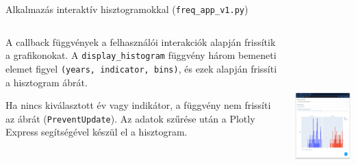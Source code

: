 \documentclass[english, aspectratio=169]{beamer}
\begin{document}
\begin{frame}{Alkalmazás interaktív hisztogramokkal (\texttt{freq\_app\_v1.py})}
	\begin{columns}
		\begin{column}{.5\textwidth}
			A callback függvények a felhasználói interakciók alapján frissítik a grafikonokat. A \texttt{display\_histogram} függvény három bemeneti elemet figyel \texttt{(years, indicator, bins)}, és ezek alapján frissíti a hisztogram ábrát.\par\medskip
			Ha nincs kiválasztott év vagy indikátor, a függvény nem frissíti az ábrát (\texttt{PreventUpdate}). Az adatok szűrése után a Plotly Express segítségével készül el a hisztogram.
		\end{column}
		\begin{column}{.5\textwidth}
			\begin{center}
				\includegraphics[width=7cm, height=7cm, keepaspectratio]{images/freq_9.png}
			\end{center}
		\end{column}
	\end{columns}
\end{frame}
\end{document}
